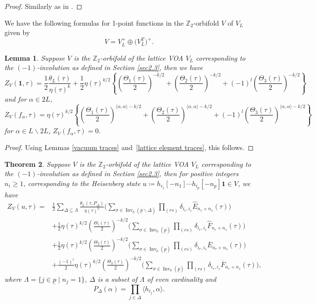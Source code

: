 \documentclass[pdftex]{sigma}
\numberwithin{equation}{section}
\newtheorem{Theorem}{Theorem}[section]
\newtheorem{Lemma}[Theorem]{Lemma}
\theoremstyle{definition}
\begin{document}
\begin{proof}
 Similarly as in \cite{Dong2000MonstrousWeight}.
\end{proof}

We have the following formulas for 1-point functions in the $\mathbb{Z}_2$-orbifold $V$ of $V_L$ given by
\[V=V_L^+\oplus \bigl(V_L^T\bigr)^+.\]

\begin{Lemma}
 Suppose $V$ is the $\mathbb{Z}_2$-orbifold of the lattice VOA $V_L$ corresponding to the $(-1)$-involution as defined in Section {\rm\ref{sec2.3}}, then we have
 \[Z_V(\mathbf{1},\tau)=\frac{1}{2}\frac{\theta_L(\tau)}{\eta(\tau)^{k}}+\frac{1}{2}\eta(\tau)^{k/2}\left\{ \left(\frac{\Theta_1(\tau)}{2}\right)^{-k/2}+ \left(\frac{\Theta_2(\tau)}{2}\right)^{-k/2}+(-1)^l \left(\frac{\Theta_3(\tau)}{2}\right)^{-k/2} \right\}\]
 and for $\alpha\in 2L$,
 \[Z_V(f_{\alpha},\tau)=\eta(\tau)^{k/2}\left\{\left(\frac{\Theta_1(\tau)}{2}\right)^{\langle\alpha,\alpha\rangle-k/2}\!
 +\left(\frac{\Theta_2(\tau)}{2}\right)^{\langle\alpha,\alpha\rangle-k/2}\!+(-1)^l \left(\frac{\Theta_3(\tau)}{2}\right)^{\langle\alpha,\alpha\rangle-k/2}\right\}\]
 for $\alpha\in L\backslash 2L$,
$Z_V(f_{\alpha},\tau)=0$.
\end{Lemma}

\begin{proof}
 Using Lemmas \ref{vacuum traces} and~\ref{lattice element traces}, this follows.
\end{proof}

\begin{Theorem}

Suppose $V$ is the $\mathbb{Z}_2$-orbifold of the lattice VOA $V_L$ corresponding to the $(-1)$-involution as defined in Section {\rm\ref{sec2.3}}, then for positive integers $n_i\geq 1$, corresponding to the Heisenberg state
$u\coloneqq h_{i_1}[-n_1]\cdots h_{i_p}[-n_p]\mathbf{1}\in V$,
we have
\begin{align*}
Z_V(u,\tau)={}&\frac{1}{2}\sum_{\Delta\subseteq \Lambda}\frac{\theta_L(\tau,P_{\Delta})}{\eta(\tau)^k}\bigg(\sum_{\sigma\in \operatorname{Inv}_0(\underline{p}\backslash \Delta)}\prod_{(rs)}\delta_{i_r,i_s}\hat{E}_{n_r+n_s}(\tau)\bigg)\\
&+\frac{1}{2}\eta(\tau)^{k/2}\left(\frac{\Theta_1(\tau)}{2}\right)^{-k/2}\bigg(\sum_{\sigma\in \operatorname{Inv}_0(\underline{p})} \prod_{(rs)}\delta_{i_r,i_s}\hat{F}_{n_r+n_s}(\tau) \bigg)\\
&+\frac{1}{2}\eta(\tau)^{k/2}\left(\frac{\Theta_2(\tau)}{2}\right)^{-k/2}\bigg(\sum_{\sigma\in \operatorname{Inv}_0(\underline{p})}\prod_{(rs)}\delta_{i_r,i_s}\overline{E}_{n_r+n_s}(\tau)\bigg)\\
&+\frac{(-1)^l}{2}\eta(\tau)^{k/2}\left(\frac{\Theta_3(\tau)}{2}\right)^{-k/2}\bigg(\sum_{\sigma\in \operatorname{Inv}_0(\underline{p})}\prod_{(rs)}\delta_{i_r,i_s}\overline{F}_{n_r+n_s}(\tau)\bigg),
\end{align*}
where $\Lambda=\{j\in \underline{p}\mid n_j=1\}$, $\Delta$ is a subset of $\Lambda$ of even cardinality and
\[P_{\Delta}(\alpha)=\prod_{j\in\Delta}\langle h_{i_j},\alpha\rangle.\]
\end{Theorem}
\end{document}
